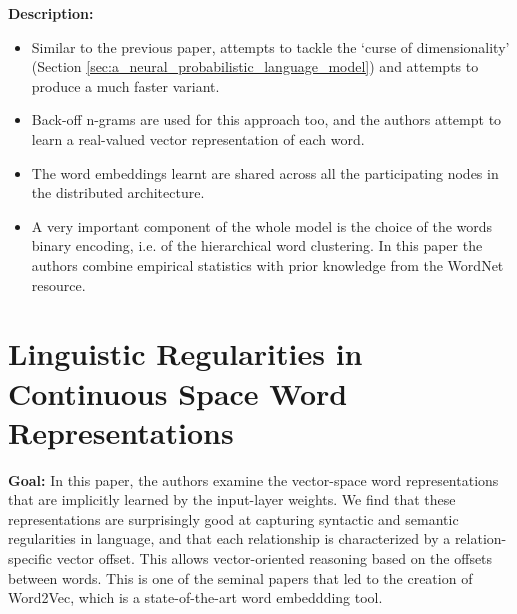 \documentclass[11pt,a4paper]{article}
\begin{document}
  \textbf{Description:}
  \begin{itemize}
    \item
    Similar to the previous paper, attempts to tackle the `curse of dimensionality' (Section \ref{sec:a_neural_probabilistic_language_model}) and attempts to produce a much faster variant.
    \item
    Back-off n-grams are used for this approach too, and the authors attempt to learn a real-valued vector representation of each word.
    \item
    The word embeddings learnt are shared across all the participating nodes in the distributed architecture.
    \item
    A very important component of the whole model is the choice of the words binary encoding, i.e. of the hierarchical word clustering. In this paper the authors combine empirical statistics with prior knowledge from the WordNet resource.
  \end{itemize}



\section{Linguistic Regularities in Continuous Space Word Representations} %
\label{sec:linguistic_regularities_in_continuous_space_word_representations}


  \textbf{Goal:}
  In this paper, the authors examine the vector-space word representations that are implicitly learned by the input-layer weights. We find that these representations are surprisingly good at capturing syntactic and semantic regularities in language, and that each relationship is characterized by a relation-specific vector offset. This allows vector-oriented reasoning based on the offsets between words\cite{mikolov2013linguistic}. This is one of the seminal papers that led to the creation of Word2Vec, which is a state-of-the-art word embeddding tool\cite{mikolov2013efficient}.\\
\end{document}
